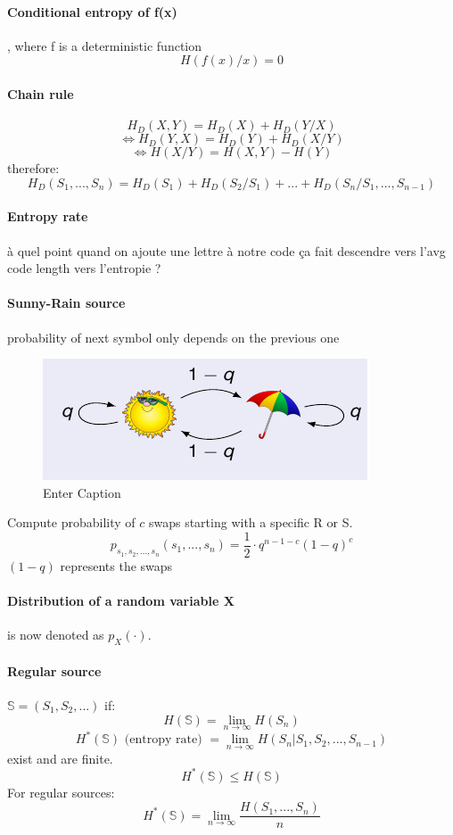 \documentclass{article}
\begin{document}
\paragraph{Conditional entropy of f(x)}, where f is a deterministic function
\[ H(f(x)/x) = 0 \]

\paragraph{Chain rule}
\[ H_D(X, Y) = H_D(X) + H_D(Y/X) \]
\[ \Leftrightarrow H_D(Y, X) = H_D(Y) + H_D(X/Y) \]
\[ \Leftrightarrow H(X/Y) = H(X, Y) - H(Y) \]
therefore:
\[ H_D(S_1, ..., S_n) = H_D(S_1) + H_D(S_2/S_1) + ... + H_D(S_n/S_1, ..., S_{n-1}) \]

\paragraph{Entropy rate} à quel point quand on ajoute une lettre à notre code ça fait descendre vers l'avg code length vers l'entropie ?

\paragraph{Sunny-Rain source} probability of next symbol only depends on the previous one

\begin{figure}[h]
    \centering
    \includegraphics[width=0.75\linewidth]{sunnyrain.png}
    \caption{Enter Caption}
    \label{fig:enter-label}
\end{figure}

Compute probability of $ c $ swaps starting with a specific R or S.
\[ p_{s_1, s_2, ..., s_n}(s_1, ..., s_n) = \frac{1}{2} \cdot q^{n-1-c}(1-q)^c \]
$ (1-q) $ represents the swaps

\paragraph{Distribution of a random variable X} is now denoted as $ p_X(\cdot) $.

\paragraph{Regular source} $ \mathbb{S} = (S_1, S_2, ...) $ if:
\[ H(\mathbb{S}) = \lim_{n\to \infty} H(S_n) \]
\[ H^{*}(\mathbb{S}) \text{ (entropy rate) } = \lim_{n\to\infty} H(S_n|S_1,S_2,...,S_{n-1}) \]
exist and are finite.
\[ H^{*}(\mathbb{S}) \leq H(\mathbb{S}) \]
For regular sources:
\[ H^{*}(\mathbb{S}) = \lim_{n\to\infty} \frac{H(S_1,...,S_n)}{n} \]
\end{document}
